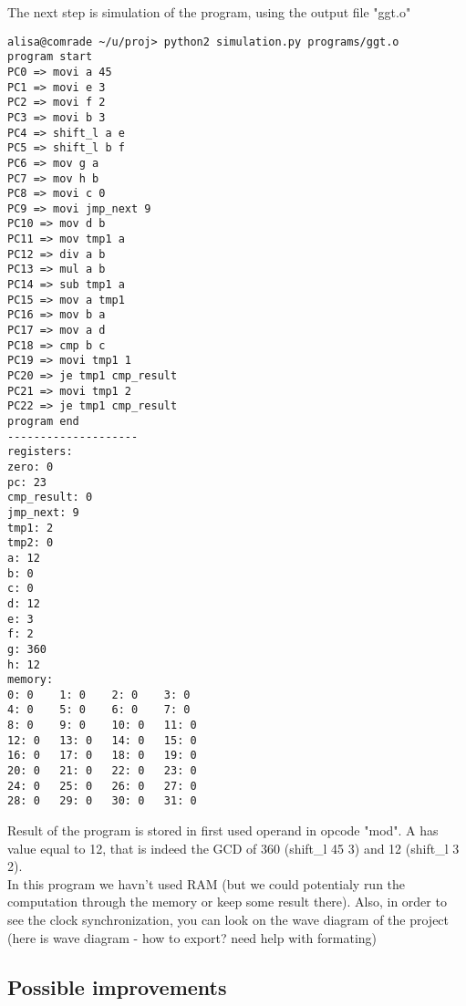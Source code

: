 \documentclass[11pt,a4paper]{article}
\begin{document}
The next step is simulation of the program, using the output file "ggt.o"
\begin{verbatim}
alisa@comrade ~/u/proj> python2 simulation.py programs/ggt.o
program start
PC0 => movi a 45
PC1 => movi e 3
PC2 => movi f 2
PC3 => movi b 3
PC4 => shift_l a e
PC5 => shift_l b f
PC6 => mov g a
PC7 => mov h b
PC8 => movi c 0
PC9 => movi jmp_next 9
PC10 => mov d b
PC11 => mov tmp1 a
PC12 => div a b
PC13 => mul a b
PC14 => sub tmp1 a
PC15 => mov a tmp1
PC16 => mov b a
PC17 => mov a d
PC18 => cmp b c
PC19 => movi tmp1 1
PC20 => je tmp1 cmp_result
PC21 => movi tmp1 2
PC22 => je tmp1 cmp_result
program end
--------------------
registers:
zero: 0
pc: 23
cmp_result: 0
jmp_next: 9
tmp1: 2
tmp2: 0
a: 12
b: 0
c: 0
d: 12
e: 3
f: 2
g: 360
h: 12
memory:
0: 0    1: 0    2: 0    3: 0
4: 0    5: 0    6: 0    7: 0
8: 0    9: 0    10: 0   11: 0
12: 0   13: 0   14: 0   15: 0
16: 0   17: 0   18: 0   19: 0
20: 0   21: 0   22: 0   23: 0
24: 0   25: 0   26: 0   27: 0
28: 0   29: 0   30: 0   31: 0
\end{verbatim}
Result of the program is stored in first used operand in opcode "mod". A has value equal to 12, that is indeed the GCD of 360 (shift\_l 45 3) and 12 (shift\_l 3 2).\\
In this program we havn't used RAM (but we could potentialy run the computation through the memory or keep some result there).
Also, in order to see the clock synchronization, you can look on the wave diagram of the project
			(here is wave diagram - how to export? need help with formating)

\subsection{Possible improvements}
\end{document}
